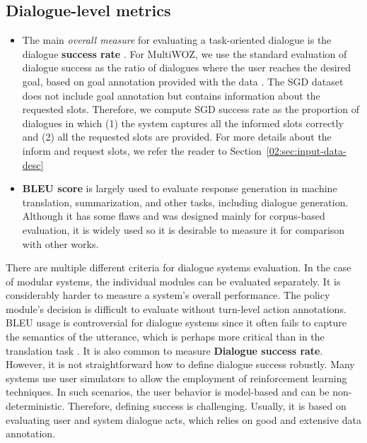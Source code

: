 \subsection{Dialogue-level metrics}
    \begin{itemize}
        \item The main \emph{overall measure} for evaluating a task-oriented dialogue is the dialogue \textbf{success rate} \cite{deriu_survey_2021}.
For MultiWOZ, we use the standard evaluation of dialogue success as the ratio of dialogues where the user reaches the desired goal, based on goal annotation provided with the data \cite{nekvinda-dusek-2021-shades}. 
The SGD dataset does not include goal annotation but contains information about the requested slots. Therefore, we compute SGD success rate as the proportion of dialogues in which (1) the system captures all the informed slots correctly and (2) all the requested slots are provided.
For more details about the inform and request slots, we refer the reader to Section~\ref{02:sec:input-data-desc}
    \item  \textbf{BLEU score} \cite{papineni-etal-2002-bleu} is largely used to evaluate response generation in machine translation, summarization, and other tasks, including dialogue generation.
    Although it has some flaws \cite{callison-burch-etal-2006-evaluating} and was designed mainly for corpus-based evaluation, it is widely used so it is desirable to measure it for comparison with other works.
\end{itemize}

There are multiple different criteria for dialogue systems evaluation.
In the case of modular systems, the individual modules can be evaluated separately.
It is considerably harder to measure a system's overall performance.
The policy module's decision is difficult to evaluate without turn-level action annotations.
BLEU usage is controversial for dialogue systems since it often fails to capture the semantics of the utterance, which is perhaps more critical than in the translation task \cite{lowe2017towards}.
It is also common to measure \textbf{Dialogue success rate}.
However, it is not straightforward how to define dialogue success robustly.
Many systems use user simulators to allow the employment of reinforcement learning techniques.
In such scenarios, the user behavior is model-based and can be non-deterministic. Therefore, defining success is challenging.
Usually, it is based on evaluating user and system dialogue acts, which relies on good and extensive data annotation.

